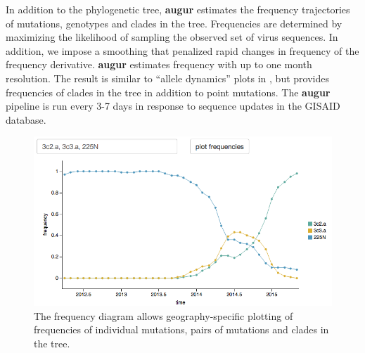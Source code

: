 \documentclass{bioinfo}
\newcommand{\augur}{\textbf{augur}}
\begin{document}
In addition to the phylogenetic tree, \augur{} estimates the frequency trajectories of mutations, genotypes and clades in the tree. Frequencies are determined by maximizing the likelihood of sampling the observed set of virus sequences. In addition, we impose a smoothing that penalized rapid changes in frequency of the frequency derivative. \augur{} estimates frequency with up to one month resolution. The result is similar to ``allele dynamics'' plots in \citet{steinbruck_allele_2011}, but provides frequencies of clades in the tree in addition to point mutations.
The \augur{} pipeline is run every 3-7 days in response to sequence updates in the GISAID database.

\begin{figure}[t]
	\centering
	\includegraphics[width=0.99\columnwidth]{frequencies}
	\caption[]{The frequency diagram allows geography-specific plotting of frequencies of individual mutations, pairs of mutations and clades in the tree.}
	\label{fig:freq}
\end{figure}
\end{document}
